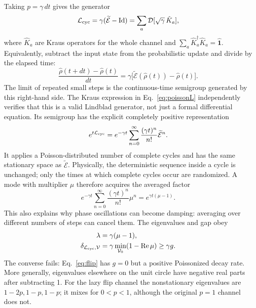 \documentclass[aps,prb,onecolumn,nofootinbib,superscriptaddress,floatfix]{revtex4-2}
\newcommand{\Id}{\hat{\mathbf 1}}
\newcommand{\E}{\widetilde{\mathcal E}}
\newcommand{\D}{\mathcal D}
\begin{document}
Taking $p=\gamma\,dt$ gives the generator
\begin{equation}
 \mathcal L_{\rm cyc}=\gamma(\E-\mathrm{Id})
   =\sum_a\D[\sqrt\gamma\,\hat K_a], \label{eq:poissonL}
\end{equation}
where $\hat K_a$ are Kraus operators for the whole channel and
$\sum_a\hat K_a^\dagger\hat K_a=\Id$.
Equivalently, subtract the input state from the probabilistic
update and divide by the elapsed time:
\begin{equation}
 \frac{\hat\rho(t+dt)-\hat\rho(t)}{dt}
       =\gamma\bigl[\E(\hat\rho(t))-\hat\rho(t)\bigr].
 \label{eq:time_step_derivative}
\end{equation}
The limit of repeated small steps is the continuous-time
semigroup generated by this right-hand side. The Kraus expression
in Eq.~\eqref{eq:poissonL} independently verifies that this is a
valid Lindblad generator, not just a formal differential equation.
Its semigroup has the
explicit completely positive representation
\begin{equation}
 e^{t\mathcal L_{\rm cyc}}
   =e^{-\gamma t}\sum_{n=0}^{\infty}
            \frac{(\gamma t)^n}{n!}\E^n. \label{eq:poisson}
\end{equation}
It applies a Poisson-distributed number of complete cycles and has
the same stationary space as $\E$. Physically, the deterministic
sequence inside a cycle is unchanged; only the times at which
complete cycles occur are randomized. A mode with multiplier $\mu$
therefore acquires the averaged factor
\begin{equation}
 e^{-\gamma t}\sum_{n=0}^{\infty}
       \frac{(\gamma t)^n}{n!}\mu^n
       =e^{\gamma t(\mu-1)}.
 \label{eq:poisson_multiplier}
\end{equation}
This also explains why phase oscillations can become damping:
averaging over different numbers of steps can cancel them.
The eigenvalues and gap obey
\begin{align}
 \lambda&=\gamma(\mu-1),\nonumber\\
 \delta_{\mathcal L_{\rm cyc},\mathcal V}
   &=\gamma\min_{\mathcal V_0}(1-\operatorname{Re}\mu)
     \ge\gamma g. \label{eq:poisson_bound}
\end{align}
The converse fails: Eq.~\eqref{eq:flip} has $g=0$ but a positive
Poissonized decay rate. More generally, eigenvalues elsewhere on
the unit circle have negative real parts after subtracting 1.
For the lazy flip channel the nonstationary eigenvalues are
$1-2p,1-p,1-p$; it mixes for $0<p<1$, although the original
$p=1$ channel does not.
\end{document}
